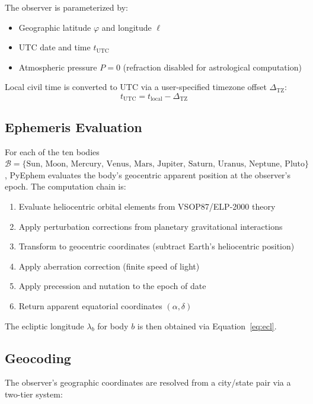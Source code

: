 \documentclass[11pt,letterpaper,twocolumn]{article}
\begin{document}
The observer is parameterized by:
\begin{itemize}[nosep]
    \item Geographic latitude $\varphi$ and longitude $\ell$
    \item UTC date and time $t_{\text{UTC}}$
    \item Atmospheric pressure $P = 0$ (refraction disabled for astrological computation)
\end{itemize}

Local civil time is converted to UTC via a user-specified timezone offset $\Delta_{\text{TZ}}$:
\begin{equation}
t_{\text{UTC}} = t_{\text{local}} - \Delta_{\text{TZ}}
\end{equation}

\subsection{Ephemeris Evaluation}

For each of the ten bodies $\mathcal{B} = \{\text{Sun, Moon, Mercury, Venus, Mars, Jupiter, Saturn, Uranus, Neptune, Pluto}\}$, PyEphem evaluates the body's geocentric apparent position at the observer's epoch. The computation chain is:

\begin{enumerate}[nosep]
    \item Evaluate heliocentric orbital elements from VSOP87/ELP-2000 theory
    \item Apply perturbation corrections from planetary gravitational interactions
    \item Transform to geocentric coordinates (subtract Earth's heliocentric position)
    \item Apply aberration correction (finite speed of light)
    \item Apply precession and nutation to the epoch of date
    \item Return apparent equatorial coordinates $(\alpha, \delta)$
\end{enumerate}

The ecliptic longitude $\lambda_b$ for body $b$ is then obtained via Equation~\ref{eq:ecl}.

\subsection{Geocoding}

The observer's geographic coordinates are resolved from a city/state pair via a two-tier system:
\end{document}
